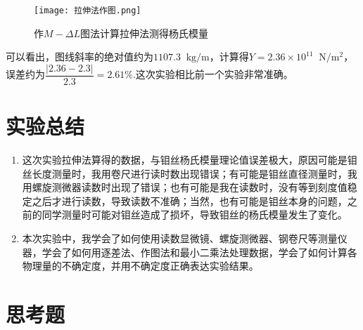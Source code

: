 \documentclass[11pt]{article}
\newcommand*{\unit}[1]{\mathop{}\!\mathrm{#1}}
\begin{document}
\begin{figure}[H]
    \centering
    \caption{作$M-\Delta L$图法计算拉伸法测得杨氏模量}
    \texttt{[image: 拉伸法作图.png]}
\end{figure}

可以看出，图线斜率的绝对值约为$1107.3 \unit{kg/m}$，计算得$Y = 2.36 \times 10^{11} \unit{N/m^2}$，误差约为$\dfrac{|2.36 - 2.3|}{2.3} = 2.61 \%$.这次实验相比前一个实验非常准确。

\section{实验总结}
\begin{enumerate}
    \item 这次实验拉伸法算得的数据，与钼丝杨氏模量理论值误差极大，原因可能是钼丝长度测量时，我用卷尺进行读时数出现错误；有可能是钼丝直径测量时，我用螺旋测微器读数时出现了错误；也有可能是我在读数时，没有等到刻度值稳定之后才进行读数，导致读数不准确；当然，也有可能是钼丝本身的问题，之前的同学测量时可能对钼丝造成了损坏，导致钼丝的杨氏模量发生了变化。
    \item 本次实验中，我学会了如何使用读数显微镜、螺旋测微器、钢卷尺等测量仪器，学会了如何用逐差法、作图法和最小二乘法处理数据，学会了如何计算各物理量的不确定度，并用不确定度正确表达实验结果。
\end{enumerate}

\section{思考题}
\end{document}
